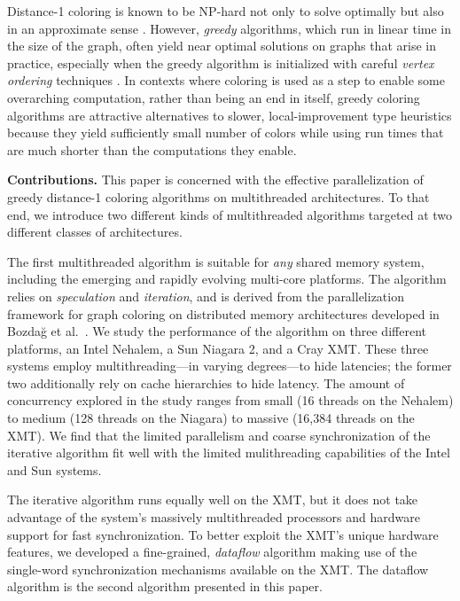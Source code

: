 \documentclass{article}
\begin{document}
Distance-1 coloring is known to be 
NP-hard not only to solve optimally but also in an approximate sense \cite{Zuckerman}. 
However, {\em greedy} algorithms, which run in linear time
in the size of the graph, often yield near optimal solutions on graphs that arise in practice, 
especially when the greedy algorithm is initialized with careful {\em vertex ordering} techniques
\cite{CoMo:83, colpack-acm}. 
In contexts where coloring is used as a step to enable some overarching computation, 
rather than being an end in itself,  greedy coloring algorithms are attractive alternatives 
to slower, local-improvement type heuristics because they yield sufficiently 
small number of colors while using run times that are much shorter than the computations 
they enable. 

{\bf Contributions. }
This paper is concerned with   the effective parallelization of greedy 
distance-1 coloring algorithms on multithreaded architectures.
To that end, we introduce two different kinds of multithreaded algorithms  targeted at 
two different classes of architectures.

The first multithreaded algorithm is suitable for {\em any} shared memory system, 
including the emerging and rapidly evolving multi-core platforms. 
The algorithm relies on {\em speculation} and {\em iteration}, and
is derived from the parallelization framework for graph coloring on 
distributed memory architectures developed in 
Bozda\u{g} et al.~\cite{BGMBC08,BCGMBO:sisc}. 
We study the performance of the algorithm on three different platforms,
an Intel Nehalem, a Sun Niagara 2, and a Cray XMT. 
These three systems employ multithreading---in varying degrees---to hide latencies; 
the former two additionally rely on cache hierarchies to hide latency. 
The amount of concurrency explored in the study ranges from small 
(16 threads on the Nehalem) to medium (128 threads on the Niagara)
to massive (16,384 threads on the XMT).
We find that the limited parallelism and coarse synchronization of the iterative algorithm fit well
with the limited mulithreading capabilities of the Intel and Sun systems. 

The iterative algorithm runs equally well on the XMT, but it does not take advantage of
the system's massively multithreaded processors and hardware support for fast synchronization.
To better exploit the XMT's unique hardware features, we developed  
a fine-grained, {\em dataflow} algorithm making use of the single-word synchronization
mechanisms available on the XMT.
The dataflow algorithm is the second algorithm presented in this paper. 
\end{document}
